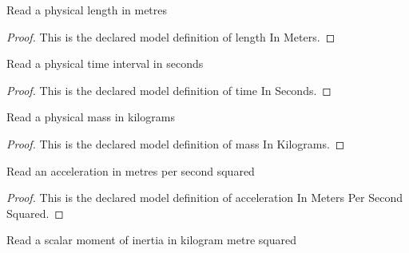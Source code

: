 \begin{definition}
  \label{def:physics:phyx-mini-0227:phyxminiproblems-problemphyxmini0227-lengthinmeters}
  Read a physical length in metres
\end{definition}
\begin{proof}
  This is the declared model definition of length In Meters.
\end{proof}
\begin{definition}
  \label{def:physics:phyx-mini-0227:phyxminiproblems-problemphyxmini0227-timeinseconds}
  Read a physical time interval in seconds
\end{definition}
\begin{proof}
  This is the declared model definition of time In Seconds.
\end{proof}
\begin{definition}
  \label{def:physics:phyx-mini-0227:phyxminiproblems-problemphyxmini0227-massinkilograms}
  Read a physical mass in kilograms
\end{definition}
\begin{proof}
  This is the declared model definition of mass In Kilograms.
\end{proof}
\begin{definition}
  \label{def:physics:phyx-mini-0227:phyxminiproblems-problemphyxmini0227-accelerationinmeterspersecondsquared}
  Read an acceleration in metres per second squared
\end{definition}
\begin{proof}
  This is the declared model definition of acceleration In Meters Per Second Squared.
\end{proof}
\begin{definition}
  \label{def:physics:phyx-mini-0227:phyxminiproblems-problemphyxmini0227-momentofinertiainkilogrammetersquared}
  Read a scalar moment of inertia in kilogram metre squared
\end{definition}
